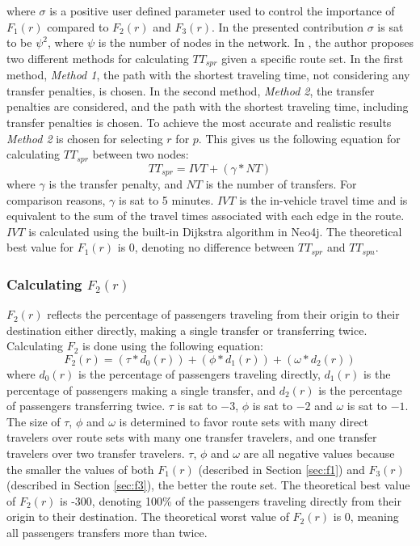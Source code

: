 where $\sigma$ is a positive user defined parameter used to control the importance of $F_{1}(r)$ compared to $F_{2}(r)$ and $F_{3}(r)$. In the presented contribution $\sigma$ is sat to be $\psi^2$, where $\psi$ is the number of nodes in the network. In \citet{fan09}, the author proposes two different methods for calculating $TT_{spr}$ given a specific route set. In the first method, \textit{Method 1}, the path with the shortest traveling time, not considering any transfer penalties, is chosen. In the second method, \textit{Method 2}, the transfer penalties are considered, and the path with the shortest traveling time, including transfer penalties is chosen. To achieve the most accurate and realistic results \textit{Method 2} is chosen for selecting $r$ for $p$. This gives us the following equation for calculating $TT_{spr}$ between two nodes: 
\newline
$$TT_{spr} = IVT + (\gamma*NT)$$
\newline
where $\gamma$ is the transfer penalty, and $NT$ is the number of transfers. For comparison reasons, $\gamma$ is sat to 5 minutes. $IVT$ is the in-vehicle travel time and is equivalent to the sum of the travel times associated with each edge in the route. $IVT$ is calculated using the built-in Dijkstra algorithm in Neo4j. The theoretical best value for $F_{1}(r)$ is 0, denoting no difference between $TT_{spr}$ and $TT_{spn}$.

\subsubsection{Calculating $F_{2}(r)$}
\label{sec:f2}
$F_{2}(r)$ reflects the percentage of passengers traveling from their origin to their destination either directly, making a single transfer or transferring twice. Calculating $F_{2}$ is done using the following equation: 
\newline
$$F_2(r) = (\tau*d_0(r)) + (\phi*d_1(r)) + (\omega*d_2(r))$$
\newline
where $d_0(r)$ is the percentage of passengers traveling directly, $d_1(r)$ is the percentage of passengers making a single transfer, and $d_2(r)$ is the percentage of passengers transferring twice. $\tau$ is sat to $-3$, $\phi$ is sat to $-2$ and $\omega$ is sat to $-1$. The size of $\tau$, $\phi$ and  $\omega$  is determined to favor route sets with many direct travelers over route sets with many one transfer travelers, and one transfer travelers over two transfer travelers.
$\tau$, $\phi$ and $\omega$ are all negative values because the smaller the values of both $F_{1}(r)$ (described in Section \vref{sec:f1}) and $F_{3}(r)$ (described in Section \vref{sec:f3}), the better the route set. The theoretical best value of $F_{2}(r)$ is -300, denoting 100\% of the passengers traveling directly from their origin to their destination. The theoretical worst value of $F_{2}(r)$ is 0, meaning all passengers transfers more than twice.

